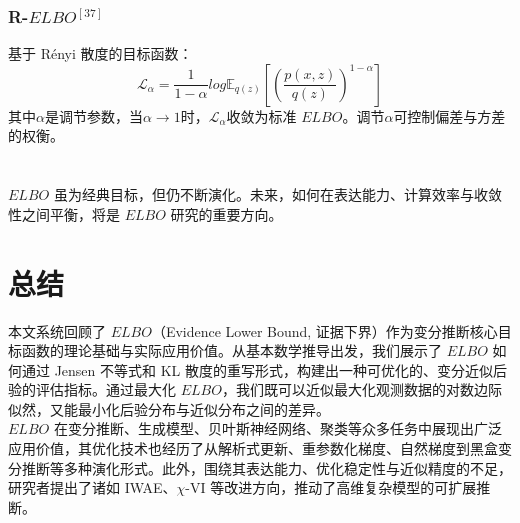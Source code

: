 \documentclass[final]{ws-ijseke}
\begin{document}
\subsubsection{R-$ELBO$$^{[37]}$}
基于 Rényi 散度的目标函数：
\begin{equation*}
\mathcal{L}_\alpha = \frac{1}{1-\alpha}log\mathbb{E}_{q(z)}[(\frac{p(x,z)}{q(z)})^{1-\alpha}]
\end{equation*}
其中$\alpha$是调节参数，当$\alpha→1$时，$\mathcal{L}_\alpha$收敛为标准 $ELBO$。调节$\alpha$可控制偏差与方差的权衡。\\\\\\
\hspace*{2em}$ELBO$ 虽为经典目标，但仍不断演化。未来，如何在表达能力、计算效率与收敛性之间平衡，将是 $ELBO$ 研究的重要方向。


\section{总结}
\hspace*{2em}本文系统回顾了 $ELBO$（Evidence Lower Bound, 证据下界）作为变分推断核心目标函数的理论基础与实际应用价值。从基本数学推导出发，我们展示了 $ELBO$ 如何通过 Jensen 不等式和 KL 散度的重写形式，构建出一种可优化的、变分近似后验的评估指标。通过最大化 $ELBO$，我们既可以近似最大化观测数据的对数边际似然，又能最小化后验分布与近似分布之间的差异。\\

$ELBO$ 在变分推断、生成模型、贝叶斯神经网络、聚类等众多任务中展现出广泛应用价值，其优化技术也经历了从解析式更新、重参数化梯度、自然梯度到黑盒变分推断等多种演化形式。此外，围绕其表达能力、优化稳定性与近似精度的不足，研究者提出了诸如 IWAE、$\chi$-VI 等改进方向，推动了高维复杂模型的可扩展推断。
\end{document}
